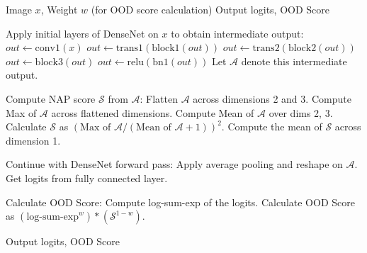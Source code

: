 \begin{algorithm}[!h]
\caption{OOD Detection Using Neural Activation Prior on DenseNet}
\begin{algorithmic}[1]
\REQUIRE Image $x$, Weight $w$ (for OOD score calculation)
\ENSURE Output logits, OOD Score

\STATE Apply initial layers of DenseNet on $x$ to obtain intermediate output:
\STATE \hspace{\algorithmicindent} $out \leftarrow \text{conv1}(x)$
\STATE \hspace{\algorithmicindent} $out \leftarrow \text{trans1}(\text{block1}(out))$
\STATE \hspace{\algorithmicindent} $out \leftarrow \text{trans2}(\text{block2}(out))$
\STATE \hspace{\algorithmicindent} $out \leftarrow \text{block3}(out)$
\STATE \hspace{\algorithmicindent} $out \leftarrow \text{relu}(\text{bn1}(out))$
\STATE \hspace{\algorithmicindent} Let $\mathcal{A}$ denote this intermediate output.

\STATE \textcolor{highlightcolor}{Compute NAP score $\mathcal{S}$ from $\mathcal{A}$:}
\STATE \textcolor{highlightcolor}{\hspace{\algorithmicindent} Flatten $\mathcal{A}$ across dimensions 2 and 3.}
\STATE \textcolor{highlightcolor}{\hspace{\algorithmicindent} Compute Max of $\mathcal{A}$ across flattened dimensions.}
\STATE \textcolor{highlightcolor}{\hspace{\algorithmicindent} Compute Mean of $\mathcal{A}$ over dims 2, 3.}
\STATE \textcolor{highlightcolor}{\hspace{\algorithmicindent} Calculate $\mathcal{S}$ as $(\text{Max of } \mathcal{A} / (\text{Mean of } \mathcal{A} + 1))^2$.}
\STATE \textcolor{highlightcolor}{\hspace{\algorithmicindent} Compute the mean of $\mathcal{S}$ across dimension 1.}

\STATE Continue with DenseNet forward pass:
\STATE \hspace{\algorithmicindent} Apply average pooling and reshape on $\mathcal{A}$.
\STATE \hspace{\algorithmicindent} Get logits from fully connected layer.

\STATE \textcolor{highlightcolor}{Calculate OOD Score:}
\STATE \textcolor{highlightcolor}{\hspace{\algorithmicindent} Compute log-sum-exp of the logits.}
\STATE \textcolor{highlightcolor}{\hspace{\algorithmicindent} Calculate OOD Score as $(\text{log-sum-exp}^w) * (\mathcal{S}^{1-w})$.}

\RETURN Output logits, OOD Score
\end{algorithmic}
\label{algo}
\end{algorithm}


